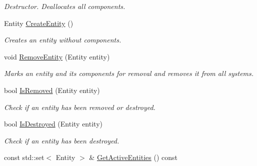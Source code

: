 \begin{DoxyCompactItemize}
\begin{DoxyCompactList}\small\item\em Destructor. Deallocates all components. \end{DoxyCompactList}\item 
Entity \hyperlink{class_e_c_s_1_1_entity_manager_a58a521f1a18027231d2895cf91a6b555}{Create\-Entity} ()
\begin{DoxyCompactList}\small\item\em Creates an entity without components. \end{DoxyCompactList}\item 
void \hyperlink{class_e_c_s_1_1_entity_manager_ae3c584bf9245a3dcbafc1cc5ea93b642}{Remove\-Entity} (Entity entity)
\begin{DoxyCompactList}\small\item\em Marks an entity and its components for removal and removes it from all systems. \end{DoxyCompactList}\item 
bool \hyperlink{class_e_c_s_1_1_entity_manager_aba46f10add91879ffd7ff4e31861d73d}{Is\-Removed} (Entity entity)
\begin{DoxyCompactList}\small\item\em Check if an entity has been removed or destroyed. \end{DoxyCompactList}\item 
bool \hyperlink{class_e_c_s_1_1_entity_manager_ada6b7ca459e79078d043c109246dcb0b}{Is\-Destroyed} (Entity entity)
\begin{DoxyCompactList}\small\item\em Check if an entity has been destroyed. \end{DoxyCompactList}\item 
\hypertarget{class_e_c_s_1_1_entity_manager_a382763effb53c305ec89bc3937a48de5}{const std\-::set$<$ Entity $>$ \& \hyperlink{class_e_c_s_1_1_entity_manager_a382763effb53c305ec89bc3937a48de5}{Get\-Active\-Entities} () const }\label{class_e_c_s_1_1_entity_manager_a382763effb53c305ec89bc3937a48de5}


\end{DoxyCompactItemize}
